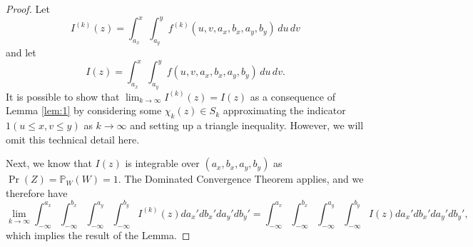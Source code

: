 \begin{proof}
  Let
  \[
    I^{(k)}(z) = \displaystyle \int_{a_x}^{x} \displaystyle
    \int_{a_y}^{y} f^{(k)}(u,v,a_x,b_x,a_y,b_y)\, du\,dv
  \]
  and let
  \[
    I(z) = \displaystyle \int_{a_x}^{x} \displaystyle \int_{a_y}^{y}
    f(u,v,a_x,b_x,a_y,b_y)\, du\,dv.
  \]
  It is possible to show that $\lim_{k\to \infty} I^{(k)}(z) = I(z)$
  as a consequence of Lemma \ref{lem:1} by considering some
  $\chi_k(z) \in S_k$ approximating the indicator
  $1(u \leq x, v \leq y)$ as $k \to \infty$ and setting up a triangle
  inequality. However, we will omit this technical detail here.

  Next, we know that $I(z)$ is integrable over $(a_x, b_x, a_y, b_y)$
  as $\Pr(Z) = \mathbb{P}_{W}(W) = 1$. The Dominated Convergence
  Theorem applies, and we therefore have
  \[
    \lim_{k \to \infty} \displaystyle \int_{-\infty}^{a_x} \displaystyle \int_{-\infty}^{b_x} \displaystyle \int_{-\infty}^{a_y} \displaystyle \int_{-\infty}^{b_y} I^{(k)}(z) da_x' db_x' da_y' db_y' = \displaystyle \int_{-\infty}^{a_x} \displaystyle \int_{-\infty}^{b_x} \displaystyle \int_{-\infty}^{a_y} \displaystyle \int_{-\infty}^{b_y} I(z) da_x' db_x' da_y' db_y',
  \]
  which implies the result of the Lemma.
\end{proof}

